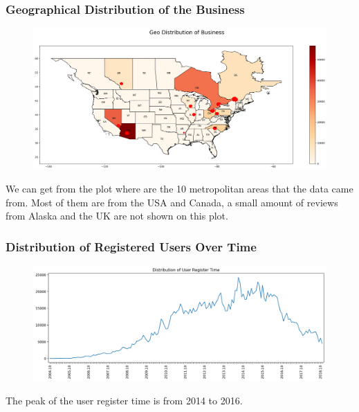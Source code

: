 \documentclass[12pt]{article}
\begin{document}
\subsubsection{Geographical Distribution of the Business}
\begin{figure}[H]
\begin{center}
    \includegraphics[width=1.0\textwidth]{../05_dataMining/distributionBusinessGeo.png}
\end{center}
\end{figure}
We can get from the plot where are the 10 metropolitan areas that the data came from. Most of them are from the USA and Canada, a small amount of reviews from Alaska and the UK are not shown on this plot.

\subsubsection{Distribution of Registered Users Over Time}
\begin{figure}[H]
\begin{center}
    \includegraphics[width=1.0\textwidth]{../05_dataMining/distributionUserRegisterTime.png}
\end{center}
\end{figure}
The peak of the user register time is from 2014 to 2016.
\end{document}
